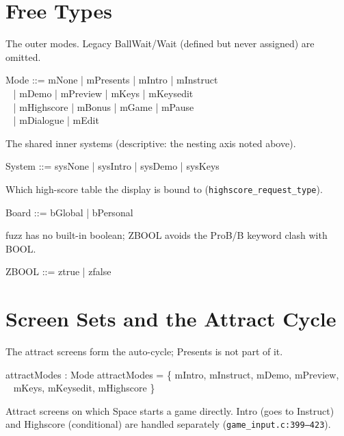 \documentclass[a4paper,10pt,fleqn]{article}
\begin{document}
\section{Free Types}

The outer modes.  Legacy \textsf{BallWait}/\textsf{Wait} (defined but
never assigned) are omitted.

\begin{zed}
  Mode ::= mNone | mPresents | mIntro | mInstruct \\
  \quad~ | mDemo | mPreview | mKeys | mKeysedit \\
  \quad~ | mHighscore | mBonus | mGame | mPause \\
  \quad~ | mDialogue | mEdit
\end{zed}

The shared inner systems (descriptive: the nesting axis noted above).

\begin{zed}
  System ::= sysNone | sysIntro | sysDemo | sysKeys
\end{zed}

Which high-score table the display is bound to
(\texttt{highscore\_request\_type}).

\begin{zed}
  Board ::= bGlobal | bPersonal
\end{zed}

fuzz has no built-in boolean; \textsf{ZBOOL} avoids the ProB/B keyword
clash with \textsf{BOOL}.

\begin{zed}
  ZBOOL ::= ztrue | zfalse
\end{zed}

\section{Screen Sets and the Attract Cycle}

The attract screens form the auto-cycle; \textsf{Presents} is not part
of it.

\begin{axdef}
  attractModes : \power Mode
  \where
  attractModes = \{ mIntro, mInstruct, mDemo, mPreview, \\
  \quad~ mKeys, mKeysedit, mHighscore \}
\end{axdef}

Attract screens on which \textsf{Space} starts a game directly.
\textsf{Intro} (goes to \textsf{Instruct}) and \textsf{Highscore}
(conditional) are handled separately (\texttt{game\_input.c:399--423}).
\end{document}
